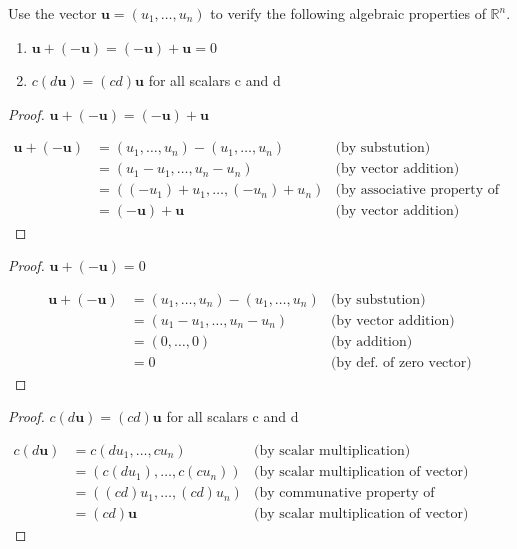 \documentclass{mathhomework}
\newcommand{\R}{\mathbb{R}}  %
\newcommand{\By}[1]{\text{(by #1)}}
\newcommand{\Vect}[1]{\pmb{#1}}
\begin{document}
\pagebreak
\begin{problem}[1.3\#34]
    Use the vector $\Vect{u} = (u_1, \ldots, u_n)$ to verify the following algebraic properties of $\R^n$.
    \begin{enumerate}[label=(\alph*)]
        \item $\Vect{u} + (-\Vect{u}) = (-\Vect{u}) + \Vect{u} = 0$
        \item $c(d\Vect{u}) = (cd)\Vect{u}$ for all scalars c and d
    \end{enumerate}

    \begin{solution}
        \begin{proof}
            $\Vect{u} + (-\Vect{u}) = (-\Vect{u}) + \Vect{u}$

            \begin{align*}
                \Vect{u} + (-\Vect{u}) & = (u_1, \ldots, u_n) - (u_1, \ldots, u_n) & \By{substution} \\
                & = (u_1 - u_1, \ldots, u_n - u_n) & \By{vector addition} \\
                & = ((-u_1) + u_1, \ldots, (-u_n) + u_n) & \By{associative property of addition} \\
                & = (-\Vect{u}) + \Vect{u} & \By{vector addition}
            \end{align*}
        \end{proof}

        \begin{proof}
            $\Vect{u} + (-\Vect{u}) = 0$

            \begin{align*}
                \Vect{u} + (-\Vect{u}) & = (u_1, \ldots, u_n) - (u_1, \ldots, u_n) & \By{substution} \\
                & = (u_1 - u_1, \ldots, u_n - u_n) & \By{vector addition} \\
                & = (0, \ldots, 0) & \By{addition} \\
                & = 0 & \By{def. of zero vector}
            \end{align*}
        \end{proof}

        \begin{proof}
            $c(d\Vect{u}) = (cd)\Vect{u}$ for all scalars c and d

            \begin{align*}
                c(d\Vect{u}) & = c(du_1, \ldots, cu_n) & \By{scalar multiplication} \\
                & = (c(du_1), \ldots, c(cu_n)) & \By{scalar multiplication of vector} \\
                & = ((cd)u_1, \ldots, (cd)u_n) & \By{communative property of multiplication} \\
                & = (cd)\Vect{u} & \By{scalar multiplication of vector}
            \end{align*}
        \end{proof}
    \end{solution}
\end{problem}
\end{document}
